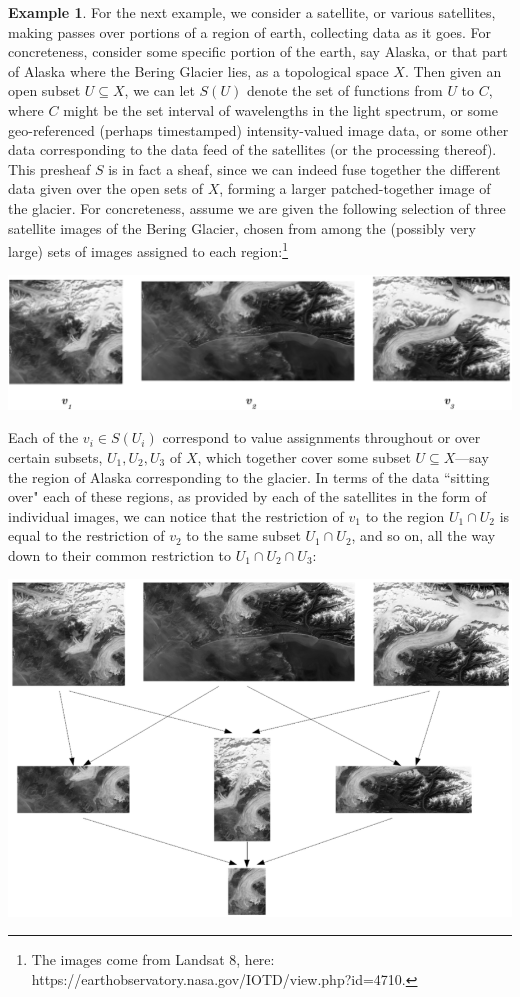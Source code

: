 \documentclass[11pt]{book}
\theoremstyle{definition}
\newtheorem{example}{Example}[section]
\theoremstyle{definition}
\theoremstyle{definition}
\theoremstyle{theorem}
\theoremstyle{definition}
\begin{document}
\begin{example} 	
	For the next example, we consider a satellite, or various satellites, making passes over portions of a region of earth, collecting data as it goes. For concreteness, consider some specific portion of the earth, say Alaska, or that part of Alaska where the Bering Glacier lies, as a topological space $X$. Then given an open subset $U \subseteq  X$, we can let $S(U)$ denote the set of functions from $U$ to $C$, where $C$ might be the set interval of wavelengths in the light spectrum, or some geo-referenced (perhaps timestamped) intensity-valued image data, or some other data corresponding to the data feed of the satellites (or the processing thereof). This presheaf $S$ is in fact a sheaf, since we can indeed fuse together the different data given over the open sets of $X$, forming a larger patched-together image of the glacier. For concreteness, assume we are given the following selection of three satellite images of the Bering Glacier, chosen from among the (possibly very large) sets of images assigned to each region:\footnote{The images come from Landsat 8, here: {https://earthobservatory.nasa.gov/IOTD/view.php?id=4710}.} 
	\begin{center}
		\includegraphics[scale=0.27]{GlacierSheafInitialPicsBW.png}  
	\end{center}
	Each of the $v_i \in S(U_i)$ correspond to value assignments throughout or over certain subsets, $U_1, U_2, U_3$ of $X$, which together cover some subset $U \subseteq  X$---say the region of Alaska corresponding to the glacier. In terms of the data ``sitting over" each of these regions, as provided by each of the satellites in the form of individual images, we can notice that the restriction of $v_1$ to the region $U_1 \cap U_2$ is equal to the restriction of $v_2$ to the same subset $U_1 \cap U_2$, and so on, all the way down to their common restriction to $U_1 \cap U_2 \cap U_3$:
	\begin{center}
		\includegraphics[scale=0.37]{GlacierSheafBW.png}

\end{center}
\end{example}
\end{document}
